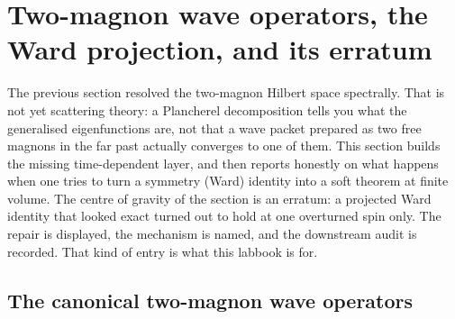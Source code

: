 
\section{Two-magnon wave operators, the Ward projection, and its erratum}
\label{sec:wave-operators}

The previous section resolved the two-magnon Hilbert space spectrally. That is
not yet scattering theory: a Plancherel decomposition tells you what the
generalised eigenfunctions are, not that a wave packet prepared as two free
magnons in the far past actually converges to one of them. This section builds
the missing time-dependent layer, and then reports honestly on what happens
when one tries to turn a symmetry (Ward) identity into a soft theorem at finite
volume. The centre of gravity of the section is an erratum: a projected Ward
identity that looked exact turned out to hold at one overturned spin only. The
repair is displayed, the mechanism is named, and the downstream audit is
recorded. That kind of entry is what this labbook is for.

\subsection{The canonical two-magnon wave operators}

